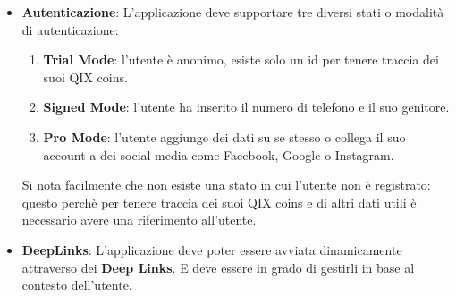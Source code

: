 \begin{itemize}
{        Tale gravità finirà con la fine dell'animazione o l'apparizione di una nuova pagina se presente.
    }
    \item {
        \textbf{Autenticazione}: L'applicazione deve supportare tre diversi stati o modalità di autenticazione:
        \begin{enumerate}
            \item\textbf{Trial Mode}: l'utente è anonimo, esiste solo un id per tenere traccia dei suoi QIX coins.
            \item\textbf{Signed Mode}: l'utente ha inserito il numero di telefono e il suo genitore.
            \item \textbf{Pro Mode}: l'utente aggiunge dei dati su se stesso o collega il suo account a dei social media come Facebook, Google o Instagram.
        \end{enumerate}
        Si nota facilmente che non esiste una stato in cui l'utente non è registrato: questo perchè
        per tenere traccia dei suoi QIX coins e di altri dati utili è necessario avere una riferimento all'utente.
    }
    \item {
        \textbf{DeepLinks}: L'applicazione deve poter essere avviata dinamicamente
        attraverso dei \textbf{Deep Links}\cite{deeplinks}.
        E deve essere in grado di gestirli in base al contesto dell'utente.
    }
\end{itemize}
